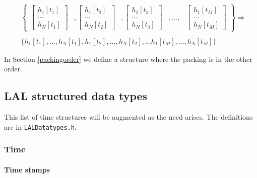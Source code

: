 \documentclass[]{ligodcc}
\begin{document}
\begin{eqnarray}
&
\left\{  
  \begin{array}{cccccc}
     \left[ 
     \begin{array}{c}
     h_1[t_1]  \\
     \dots     \\
     h_N[t_1]  
     \end{array} 
     \right]
     &
     ,
     \left[ 
     \begin{array}{c}
         h_1[t_2]  \\
         \dots     \\
         h_N[t_2]  
     \end{array} 
     \right]
     &
     ,
     \left[ 
     \begin{array}{c}
         h_1[t_3]  \\
         \dots     \\
         h_N[t_3]  
     \end{array} 
     \right]
     &
     , \dots ,
     &
     \left[ 
     \begin{array}{c}
         h_1[t_M]  \\
         \dots     \\
         h_N[t_M]  
     \end{array} 
     \right]
   \end{array}
\right\}
\Longrightarrow \nonumber \\
\nonumber \\
&
\{ h_1[t_1], \dots , h_N[t_1], h_1[t_2], \dots , 
h_N[t_2] , \dots h_1[t_M], \dots , h_N[t_M]\}
\end{eqnarray}

In Section \ref{packingorder} we define a structure where the packing
is in the other order.

\subsection{LAL structured data types}
\label{structured}

This list of time structures will be augmented as the need arises. The
definitions are in {\tt LALDatatypes.h}.


\subsubsection{Time}

\paragraph{Time stamps \\}
\end{document}
